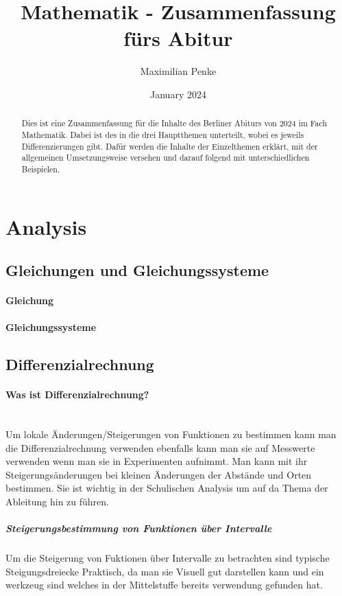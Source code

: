\documentclass{article}
\title{Mathematik - Zusammenfassung fürs Abitur}
\author{Maximilian Penke}
\date{January 2024}
\begin{document}
    \maketitle

    \begin{abstract}
        Dies ist eine Zusammenfassung für die Inhalte des Berliner Abiturs von 2024 im Fach Mathematik. Dabei ist des in die drei Hauptthemen unterteilt, wobei es jeweils Differenzierungen gibt. Dafür werden die Inhalte der Einzelthemen erklärt, mit der allgemeinen Umsetzungsweise versehen und darauf folgend mit unterschiedlichen Beispielen.
    \end{abstract}

    \tableofcontents

    \section{Analysis}
        \subsection{Gleichungen und Gleichungssysteme}
        \paragraph{Gleichung}
        \paragraph{Gleichungssysteme}
        \subsection{Differenzialrechnung}
        \paragraph{Was ist Differenzialrechnung?\\\\}
        Um lokale Änderungen/Steigerungen von Funktionen zu bestimmen kann man die Differenzialrechnung verwenden ebenfalls kann man sie auf  Messwerte verwenden wenn man sie in Experimenten aufnimmt. Man kann mit ihr Steigerungsänderungen bei kleinen Änderungen der Abstände und Orten bestimmen. Sie ist wichtig in der Schulischen Analysis um auf da Thema der Ableitung hin zu führen.
        \subparagraph{Steigerungsbestimmung von Funktionen über Intervalle}
        Um die Steigerung von Fuktionen über Intervalle zu betrachten sind typische Steigungsdreiecke Praktisch, da man sie Visuell gut darstellen kann und ein werkzeug sind welches in der Mittelstuffe bereits verwendung gefunden hat.
\end{document}
